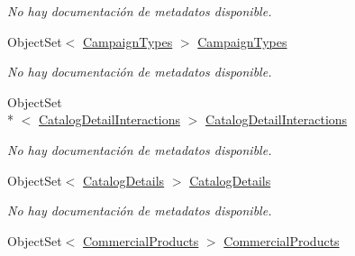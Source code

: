 \begin{DoxyCompactItemize}
\begin{DoxyCompactList}\small\item\em No hay documentación de metadatos disponible. \end{DoxyCompactList}\item 
Object\-Set$<$ \hyperlink{class_microsoft_1_1_samples_1_1_kinect_1_1_basic_interactions_1_1_campaign_types}{Campaign\-Types} $>$ \hyperlink{class_microsoft_1_1_samples_1_1_kinect_1_1_basic_interactions_1_1_o_m_k_t_d_b_entities_a87c18ae800cddf822350f2a6d5163911}{Campaign\-Types}
\begin{DoxyCompactList}\small\item\em No hay documentación de metadatos disponible. \end{DoxyCompactList}\item 
Object\-Set\\*
$<$ \hyperlink{class_microsoft_1_1_samples_1_1_kinect_1_1_basic_interactions_1_1_catalog_detail_interactions}{Catalog\-Detail\-Interactions} $>$ \hyperlink{class_microsoft_1_1_samples_1_1_kinect_1_1_basic_interactions_1_1_o_m_k_t_d_b_entities_adf80e6c5bbac65f3475e36e85711d6be}{Catalog\-Detail\-Interactions}
\begin{DoxyCompactList}\small\item\em No hay documentación de metadatos disponible. \end{DoxyCompactList}\item 
Object\-Set$<$ \hyperlink{class_microsoft_1_1_samples_1_1_kinect_1_1_basic_interactions_1_1_catalog_details}{Catalog\-Details} $>$ \hyperlink{class_microsoft_1_1_samples_1_1_kinect_1_1_basic_interactions_1_1_o_m_k_t_d_b_entities_adc52fa8bb331dd3d7f82235e51022eba}{Catalog\-Details}
\begin{DoxyCompactList}\small\item\em No hay documentación de metadatos disponible. \end{DoxyCompactList}\item 
Object\-Set$<$ \hyperlink{class_microsoft_1_1_samples_1_1_kinect_1_1_basic_interactions_1_1_commercial_products}{Commercial\-Products} $>$ \hyperlink{class_microsoft_1_1_samples_1_1_kinect_1_1_basic_interactions_1_1_o_m_k_t_d_b_entities_a629e71a591ee34c5c910ce053a2387a1}{Commercial\-Products}

\end{DoxyCompactItemize}
